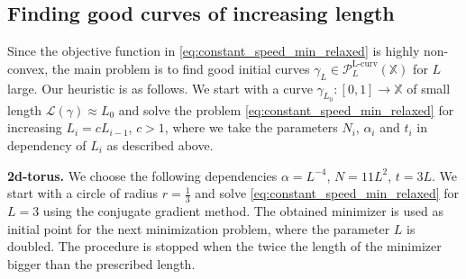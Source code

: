 \documentclass[draft,
a4paper,11pt,DIV=11,%
abstract=on%
]{scrartcl}
\DeclareMathOperator{\Lcurve}{L-curv}
\begin{document}
\subsection{Finding good curves of increasing length}

Since the objective function in \eqref{eq:constant_speed_min_relaxed} is highly non-convex, the main problem is to find good initial curves $\gamma_{L} \in  \mathcal P_{L}^{\Lcurve}(\mathbb X)$ for $L$ large. Our heuristic is as follows. We start with a curve $\gamma_{L_{0}}:[0,1]\to \mathbb X$ of small length $\mathcal L(\gamma) \approx L_{0}$ and solve the problem \eqref{eq:constant_speed_min_relaxed} for increasing $L_{i} = c L_{i-1}$, $c>1$, where we take the parameters $N_{i}$, $\alpha_{i}$ and $t_{i}$ in dependency of $L_{i}$ as described above.

\textbf{2d-torus.}
We choose the following dependencies $\alpha = L^{-4}$, $N =11 L^{2}$, $t=3 L$. We start with a circle of radius $r=\frac13$ and solve \eqref{eq:constant_speed_min_relaxed} for $L=3$ using the conjugate gradient method. The obtained minimizer is used as initial point for the next minimization problem, where the parameter $L$ is doubled. The procedure is stopped when the twice the length of the minimizer bigger than the prescribed length.

%
%
\end{document}
